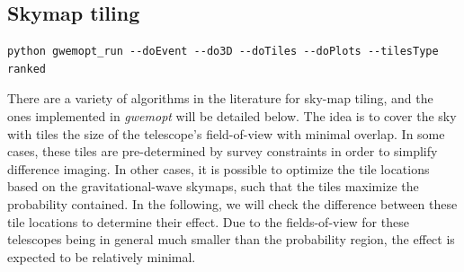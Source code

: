 \documentclass[twocolumn]{aastex61}
\begin{document}
\subsection{Skymap tiling}
\begin{lstlisting}
python gwemopt_run --doEvent --do3D --doTiles --doPlots --tilesType ranked
\end{lstlisting}
There are a variety of algorithms in the literature for sky-map tiling, and the ones implemented in \emph{gwemopt} will be detailed below. The idea is to cover the sky with tiles the size of the telescope's field-of-view with minimal overlap. In some cases, these tiles are pre-determined by survey constraints in order to simplify difference imaging. In other cases, it is possible to optimize the tile locations based on the gravitational-wave skymaps, such that the tiles maximize the probability contained. In the following, we will check the difference between these tile locations to determine their effect. Due to the fields-of-view for these telescopes being in general much smaller than the probability region, the effect is expected to be relatively minimal.
\end{document}
